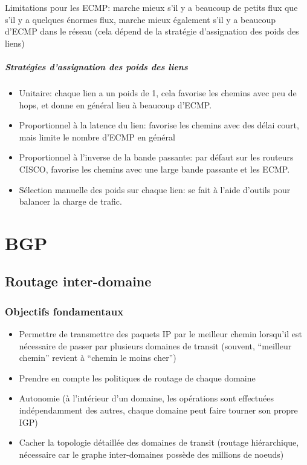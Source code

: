 \documentclass{report}
\begin{document}
Limitations pour les ECMP: marche mieux s'il y a beaucoup de petits
flux que s'il y a quelques énormes flux, marche mieux également s'il y
a beaucoup d'ECMP dans le réseau (cela dépend de la stratégie
d'assignation des poids des liens)

\paragraph{Stratégies d'assignation des poids des liens}

\begin{itemize}
\item Unitaire: chaque lien a un poids de 1, cela favorise les chemins
  avec peu de hops, et donne en général lieu à beaucoup d'ECMP.
\item Proportionnel à la latence du lien: favorise les chemins avec
  des délai court, mais limite le nombre d'ECMP en général
\item Proportionnel à l'inverse de la bande passante: par défaut sur
  les routeurs CISCO, favorise les chemins avec une large bande
  passante et les ECMP.
\item Sélection manuelle des poids sur chaque lien: se fait à l'aide
  d'outils pour balancer la charge de trafic.
\end{itemize}

\chapter{BGP}

\section{Routage inter-domaine}

\subsection{Objectifs fondamentaux}

\begin{itemize}
\item Permettre de transmettre des paquets IP par le meilleur chemin
  lorsqu'il est nécessaire de passer par plusieurs domaines de transit
  (souvent, ``meilleur chemin'' revient à ``chemin le moins cher'')
\item Prendre en compte les politiques de routage de chaque domaine
\item Autonomie (à l'intérieur d'un domaine, les opérations sont
  effectuées indépendamment des autres, chaque domaine peut faire
  tourner son propre IGP)
\item Cacher la topologie détaillée des domaines de transit (routage
  hiérarchique, nécessaire car le graphe inter-domaines possède des
  millions de noeuds)
\end{itemize}
\end{document}
